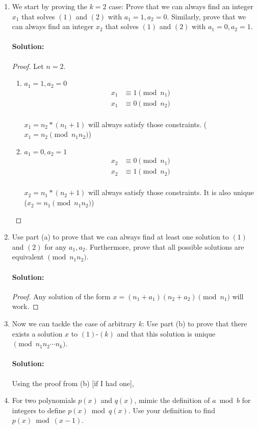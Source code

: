 \documentclass[11pt, notitlepage]{report}
\newenvironment{solution}{\paragraph{Solution:}}{\hfill}
\begin{document}
\begin{enumerate}[label=\alph*)]
\item We start by proving the $k=2$ case: Prove that we can always find an integer $x_1$ 
that solves $(1)$ and $(2)$ with $a_1 = 1, a_2 = 0$. Similarly, prove that we can always 
find an integer $x_2$ that solves $(1)$ and $(2)$ with $a_1 = 0, a_2 = 1$.
\begin{solution}
	\begin{proof}
		Let $n=2$. 
		\begin{enumerate}[label=(\roman*)]
		\item $a_1 = 1, a_2 = 0$
		\begin{align}
			x_1&\equiv 1 \pmod{n_1} \\
			x_1&\equiv 0 \pmod{n_2} \\
		\end{align}
		
		$x_1 = n_2 * (n_1 + 1)$ will always satisfy those constraints. ($x_1 = n_2\pmod{n_1n_2}$)
		\item $a_1 = 0, a_2 = 1$
		\begin{align}
			x_2&\equiv 0 \pmod{n_1} \\
			x_2&\equiv 1 \pmod{n_2} \\
		\end{align}
		
		$x_2 = n_1 * (n_2 + 1)$ will always satisfy those constraints. It is also unique ($x_2 = n_1\pmod{n_1n_2}$)

		\end{enumerate}
	\end{proof}
\end{solution}
\newpage
\item Use part (a) to prove that we can always find at least one solution to $(1)$ and $(2)$ for any $a_1,a_2$. Furthermore, prove that all possible solutions are equivalent 
$\pmod{n_1n_2}$. 
\begin{solution}
	\begin{proof}
		Any solution of the form $x=(n_1+a_1)(n_2+a_2) \pmod{n_1}$ will work.
		
	\end{proof}
\end{solution}

\item Now we can tackle the case of arbitrary $k$: Use part (b) to prove that there exists
a solution $x$ to $(1)$-$(k)$ and that this solution is unique $\pmod{n_1 n_2 \cdots n_k}$.
\begin{solution}
	Using the proof from (b) [if I had one], 
\end{solution}
\item For two polynomials $p(x)$ and $q(x)$, mimic the definition of $a \bmod{b}$ for 
integers to define $p(x) \bmod{q(x)}$. Use your definition to find $p(x) \bmod{(x-1)}$.


\end{enumerate}
\end{document}
